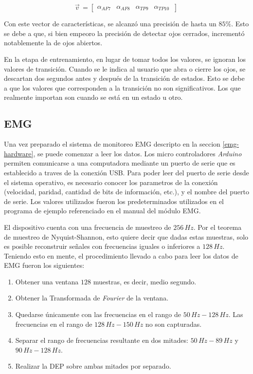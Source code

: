 \[
  \vec{v}^{\, }=
  \left[ {\begin{array}{cccc}
   \alpha_{AF7}  & \alpha_{AF8} & \alpha_{TP9} & \alpha_{TP10}  \     \end{array} } \right]
\] 

Con este vector de características, se alcanzó una precisión de hasta un $ 85 \%$. Esto se debe a que, si bien empeoro la precisión de detectar ojos cerrados, incrementó notablemente la de ojos abiertos.
 
En la etapa de entrenamiento, en lugar de tomar todos los valores, se ignoran los valores de transición. Cuando se le indica al usuario que abra o cierre los ojos, se descartan dos segundos antes y después de la transición de estados. Esto se debe a que los valores que corresponden a la transición no son significativos. Los que realmente importan son cuando se está en un estado u otro.
 
\subsection{EMG}

Una vez preparado el sistema de monitoreo EMG descripto en la seccion \ref{emg-hardware}, se puede comenzar a leer los datos. Los micro controladores \emph{Arduino} permiten comunicarse a una computadora mediante un puerto de serie que es establecido a traves de la conexión USB.  Para poder leer del puerto de serie desde el sistema operativo, es necesario conocer los parametros de la conexión (velocidad, paridad, cantidad de bits de información, etc.), y el nombre del puerto de serie. Los valores utilizados fueron los predeterminados utilizados en el programa de ejemplo referenciado en el manual del módulo EMG\cite{olimex-manual}.

El dispositivo cuenta con una frecuencia de muestreo de $256\, Hz$. Por el teorema de muestreo de Nyquist-Shannon, esto quiere decir que dadas estas muestras, solo es posible reconstruir señales con frecuencias iguales o inferiores a $128\, Hz$. Teniendo esto en mente, el procedimiento llevado a cabo para leer los datos de EMG fueron los siguientes:

 \begin{enumerate}
 \item Obtener una ventana $128$ muestras, es decir, medio segundo.
 \item Obtener la Transformada de \emph{Fourier} de la ventana.
 \item Quedarse únicamente con las frecuencias en el rango de $50 \, Hz-128 \, Hz$. Las frecuencias en el rango de $128 \, Hz-150 \, Hz$ no son capturadas.
 \item Separar el rango de frecuencias resultante en dos mitades: $50 \, Hz-89 \, Hz$ y $90 \, Hz-128 \, Hz$.
 \item Realizar la DEP sobre ambas mitades por separado.
 \end{enumerate}

